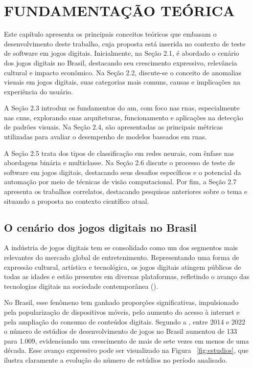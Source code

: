 \chapter{FUNDAMENTAÇÃO TEÓRICA}

Este capítulo apresenta os principais conceitos teóricos que embasam o desenvolvimento deste trabalho, cuja proposta está inserida no contexto de teste de software em jogos digitais. Inicialmente, na Seção 2.1, é abordado o cenário dos jogos digitais no Brasil, destacando seu crescimento expressivo, relevância cultural e impacto econômico. Na Seção 2.2, discute-se o conceito de anomalias visuais em jogos digitais, suas categorias mais comuns, causas e implicações na experiência do usuário.

A Seção 2.3 introduz os fundamentos do \gls{am}, com foco nas \glspl{rna}, especialmente nas \glspl{cnn}, explorando suas arquiteturas, funcionamento e aplicações na detecção de padrões visuais. Na Seção 2.4, são apresentadas as principais métricas utilizadas para avaliar o desempenho de modelos baseados em \glspl{rna}.

A Seção 2.5 trata dos tipos de classificação em redes neurais, com ênfase nas abordagens binária e multiclasse. Na Seção 2.6 discute o processo de teste de software em jogos digitais, destacando seus desafios específicos e o potencial da automação por meio de técnicas de visão computacional. Por fim, a Seção 2.7 apresenta os trabalhos correlatos, destacando pesquisas anteriores sobre o tema e situando a proposta no contexto científico atual.

\section{O cenário dos jogos digitais no Brasil} 

A indústria de jogos digitais tem se consolidado como um dos segmentos mais relevantes do mercado global de entretenimento. Representando uma forma de expressão cultural, artística e tecnológica, os jogos digitais atingem públicos de todas as idades e estão presentes em diversas plataformas, refletindo o avanço das tecnologias digitais na sociedade contemporânea (). 

No Brasil, esse fenômeno tem ganhado proporções significativas, impulsionado pela popularização de dispositivos móveis, pelo aumento do acesso à internet e pela ampliação do consumo de conteúdos digitais. Segundo a , entre 2014 e 2022 o número de estúdios de desenvolvimento de jogos no Brasil aumentou de 133 para 1.009, evidenciando um crescimento de mais de sete vezes em menos de uma década. Esse avanço expressivo pode ser visualizado na Figura ~\ref{fig:estudios}, que ilustra claramente a evolução do número de estúdios no período analisado.

